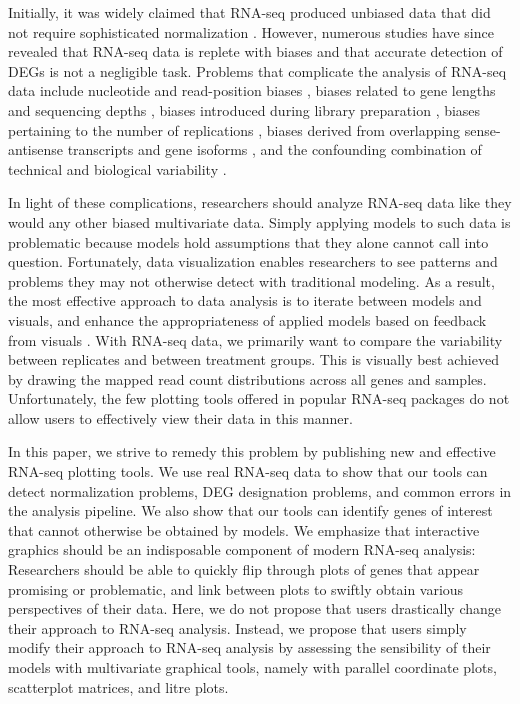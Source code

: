 \documentclass[11pt,a4paper,oldfontcommands,openany]{memoir}
\numberwithin{equation}{section} %
\begin{document}
Initially, it was widely claimed that RNA-seq produced unbiased data that did not require sophisticated normalization \citep{Wang, Morin, Marioni}. However, numerous studies have since revealed that RNA-seq data is replete with biases and that accurate detection of DEGs is not a negligible task. Problems that complicate the analysis of RNA-seq data include nucleotide and read-position biases \citep{Hansen}, biases related to gene lengths and sequencing depths \citep{Oshlack, RobinsonOshlack}, biases introduced during library preparation \citep{McIntyre}, biases pertaining to the number of replications \citep{Schurch}, biases derived from overlapping sense-antisense transcripts and gene isoforms \citep{Trapnell2013}, and the confounding combination of technical and biological variability \citep{Bullard}.

In light of these complications, researchers should analyze RNA-seq data like they would any other biased multivariate data. Simply applying models to such data is problematic because models hold assumptions that they alone cannot call into question. Fortunately, data visualization enables researchers to see patterns and problems they may not otherwise detect with traditional modeling. As a result, the most effective approach to data analysis is to iterate between models and visuals, and enhance the appropriateness of applied models based on feedback from visuals \citep{Shneiderman}. With RNA-seq data, we primarily want to compare the variability between replicates and between treatment groups. This is visually best achieved by drawing the mapped read count distributions across all genes and samples. Unfortunately, the few plotting tools offered in popular RNA-seq packages do not allow users to effectively view their data in this manner.

In this paper, we strive to remedy this problem by publishing new and effective RNA-seq plotting tools. We use real RNA-seq data to show that our tools can detect normalization problems, DEG designation problems, and common errors in the analysis pipeline. We also show that our tools can identify genes of interest that cannot otherwise be obtained by models. We emphasize that interactive graphics should be an indisposable component of modern RNA-seq analysis: Researchers should be able to quickly flip through plots of genes that appear promising or problematic, and link between plots to swiftly obtain various perspectives of their data. Here, we do not propose that users drastically change their approach to RNA-seq analysis. Instead, we propose that users simply modify their approach to RNA-seq analysis by assessing the sensibility of their models with multivariate graphical tools, namely with parallel coordinate plots, scatterplot matrices, and litre plots.
\end{document}
